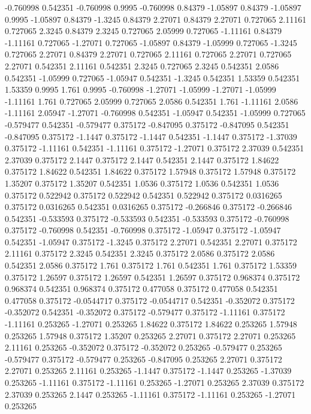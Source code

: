 -0.760998 0.542351
-0.760998 0.9995
-0.760998 0.84379
-1.05897 0.84379
-1.05897 0.9995
-1.05897 0.84379
-1.3245 0.84379
2.27071 0.84379
2.27071 0.727065
2.11161 0.727065
2.3245 0.84379
2.3245 0.727065
2.05999 0.727065
-1.11161 0.84379
-1.11161 0.727065
-1.27071 0.727065
-1.05897 0.84379
-1.05999 0.727065
-1.3245 0.727065
2.27071 0.84379
2.27071 0.727065
2.11161 0.727065
2.27071 0.727065
2.27071 0.542351
2.11161 0.542351
2.3245 0.727065
2.3245 0.542351
2.0586 0.542351
-1.05999 0.727065
-1.05947 0.542351
-1.3245 0.542351
1.53359 0.542351
1.53359 0.9995
1.761 0.9995
-0.760998 -1.27071
-1.05999 -1.27071
-1.05999 -1.11161
1.761 0.727065
2.05999 0.727065
2.0586 0.542351
1.761 -1.11161
2.0586 -1.11161
2.05947 -1.27071
-0.760998 0.542351
-1.05947 0.542351
-1.05999 0.727065
-0.579477 0.542351
-0.579477 0.375172
-0.847095 0.375172
-0.847095 0.542351
-0.847095 0.375172
-1.1447 0.375172
-1.1447 0.542351
-1.1447 0.375172
-1.37039 0.375172
-1.11161 0.542351
-1.11161 0.375172
-1.27071 0.375172
2.37039 0.542351
2.37039 0.375172
2.1447 0.375172
2.1447 0.542351
2.1447 0.375172
1.84622 0.375172
1.84622 0.542351
1.84622 0.375172
1.57948 0.375172
1.57948 0.375172
1.35207 0.375172
1.35207 0.542351
1.0536 0.375172
1.0536 0.542351
1.0536 0.375172
0.522942 0.375172
0.522942 0.542351
0.522942 0.375172
0.0316265 0.375172
0.0316265 0.542351
0.0316265 0.375172
-0.266846 0.375172
-0.266846 0.542351
-0.533593 0.375172
-0.533593 0.542351
-0.533593 0.375172
-0.760998 0.375172
-0.760998 0.542351
-0.760998 0.375172
-1.05947 0.375172
-1.05947 0.542351
-1.05947 0.375172
-1.3245 0.375172
2.27071 0.542351
2.27071 0.375172
2.11161 0.375172
2.3245 0.542351
2.3245 0.375172
2.0586 0.375172
2.0586 0.542351
2.0586 0.375172
1.761 0.375172
1.761 0.542351
1.761 0.375172
1.53359 0.375172
1.26597 0.375172
1.26597 0.542351
1.26597 0.375172
0.968374 0.375172
0.968374 0.542351
0.968374 0.375172
0.477058 0.375172
0.477058 0.542351
0.477058 0.375172
-0.0544717 0.375172
-0.0544717 0.542351
-0.352072 0.375172
-0.352072 0.542351
-0.352072 0.375172
-0.579477 0.375172
-1.11161 0.375172
-1.11161 0.253265
-1.27071 0.253265
1.84622 0.375172
1.84622 0.253265
1.57948 0.253265
1.57948 0.375172
1.35207 0.253265
2.27071 0.375172
2.27071 0.253265
2.11161 0.253265
-0.352072 0.375172
-0.352072 0.253265
-0.579477 0.253265
-0.579477 0.375172
-0.579477 0.253265
-0.847095 0.253265
2.27071 0.375172
2.27071 0.253265
2.11161 0.253265
-1.1447 0.375172
-1.1447 0.253265
-1.37039 0.253265
-1.11161 0.375172
-1.11161 0.253265
-1.27071 0.253265
2.37039 0.375172
2.37039 0.253265
2.1447 0.253265
-1.11161 0.375172
-1.11161 0.253265
-1.27071 0.253265
